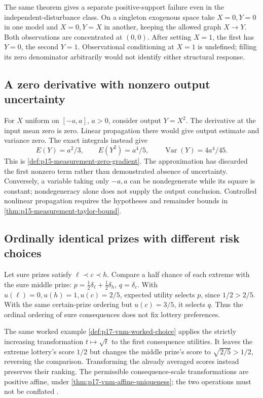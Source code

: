 The same theorem gives a separate positive-support failure even in the
independent-disturbance class. On a singleton exogenous space take
\(X=0,Y=0\) in one model and \(X=0,Y=X\) in another, keeping the allowed
graph \(X\to Y\). Both observations are concentrated at \((0,0)\).
After setting \(X=1\), the first has \(Y=0\), the second \(Y=1\).
Observational conditioning at \(X=1\) is undefined; filling its zero
denominator arbitrarily would not identify either structural response.

\subsection{A zero derivative with nonzero output uncertainty}
\label{sec:p14-counter-linearization}

For \(X\) uniform on \([-a,a]\), \(a>0\), consider output \(Y=X^2\).
The derivative at the input mean zero is zero. Linear propagation there
would give output estimate and variance zero. The exact integrals instead
give
\[
 E(Y)=a^2/3,\qquad E(Y^2)=a^4/5,\qquad
 \operatorname{Var}(Y)=4a^4/45.
\]
This is \cref{def:p15-measurement-zero-gradient}. The approximation has
discarded the first nonzero term rather than demonstrated absence of
uncertainty. Conversely, a variable taking only \(-a,a\) can be
nondegenerate while its square is constant; nondegeneracy alone does not
supply the output conclusion. Controlled nonlinear propagation requires
the hypotheses and remainder bounds in
\cref{thm:p15-measurement-taylor-bound}.

\subsection{Ordinally identical prizes with different risk choices}
\label{sec:p14-counter-utility}

Let sure prizes satisfy \(\ell\prec c\prec h\). Compare a half chance
of each extreme with the sure middle prize:
\(p=\tfrac12\delta_\ell+\tfrac12\delta_h\), \(q=\delta_c\).
With \(u(\ell)=0,u(h)=1,u(c)=2/5\), expected utility selects
\(p\), since \(1/2>2/5\). With the same certain-prize ordering but
\(u(c)=3/5\), it selects \(q\). Thus the ordinal ordering of sure
consequences does not fix lottery preferences.

The same worked example \cref{def:p17-vnm-worked-choice} applies the
strictly increasing transformation \(t\mapsto\sqrt t\) to the first
consequence utilities. It leaves the extreme lottery's score \(1/2\)
but changes the middle prize's score to \(\sqrt{2/5}>1/2\), reversing
the comparison. Transforming the already averaged scores instead preserves
their ranking. The permissible consequence-scale transformations are positive
affine, under \cref{thm:p17-vnm-affine-uniqueness}; the two operations
must not be conflated \cite{Rubinstein2015LectureNotes}.

